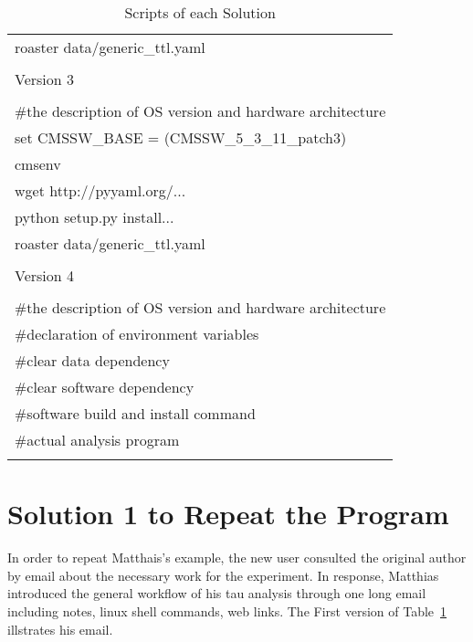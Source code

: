 \documentclass{acm_proc_article-sp}
\begin{document}
\begin{table}
\begin{tabular}{|l|}
        roaster data/generic\_ttl.yaml \\ 
        \\ \hline
        Version 3\\ \hline
        \\
        \#the description of OS version and hardware architecture \\
        set CMSSW\_BASE = (CMSSW\_5\_3\_11\_patch3) \\ 
        cmsenv \\
        wget http://pyyaml.org/... \\
        python setup.py install... \\
        roaster data/generic\_ttl.yaml \\
        \\ \hline
        Version 4\\ \hline
        \\
        \#the description of OS version and hardware architecture \\
        \#declaration of environment variables\\
        \#clear data dependency\\
        \#clear software dependency\\
        \#software build and install command\\
        \#actual analysis program\\ 
        \\ \hline
    \end{tabular}
    \caption{Scripts of each Solution}
    \label{table:scripts}
\end{table}

\section{Solution 1 to Repeat the Program}
In order to repeat Matthais's example, the new user consulted the original author by email about the necessary work for the experiment. In response, Matthias introduced the general workflow of his tau analysis through one long email including notes, linux shell commands, web links. The First version of Table~\ref{table:scripts} illstrates his email.
\end{document}
